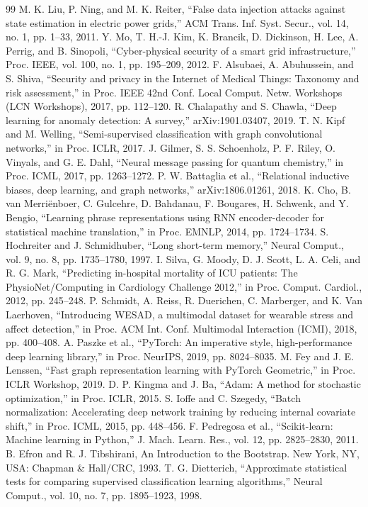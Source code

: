 \documentclass[conference]{IEEEtran}
\begin{document}
\begin{thebibliography}{99}
M. K. Liu, P. Ning, and M. K. Reiter, ``False data injection attacks against state estimation in electric power grids,'' ACM Trans. Inf. Syst. Secur., vol. 14, no. 1, pp. 1--33, 2011.
Y. Mo, T. H.-J. Kim, K. Brancik, D. Dickinson, H. Lee, A. Perrig, and B. Sinopoli, ``Cyber-physical security of a smart grid infrastructure,'' Proc. IEEE, vol. 100, no. 1, pp. 195--209, 2012.
F. Alsubaei, A. Abuhussein, and S. Shiva, ``Security and privacy in the Internet of Medical Things: Taxonomy and risk assessment,'' in Proc. IEEE 42nd Conf. Local Comput. Netw. Workshops (LCN Workshops), 2017, pp. 112--120.
R. Chalapathy and S. Chawla, ``Deep learning for anomaly detection: A survey,'' arXiv:1901.03407, 2019.
T. N. Kipf and M. Welling, ``Semi-supervised classification with graph convolutional networks,'' in Proc. ICLR, 2017.
J. Gilmer, S. S. Schoenholz, P. F. Riley, O. Vinyals, and G. E. Dahl, ``Neural message passing for quantum chemistry,'' in Proc. ICML, 2017, pp. 1263--1272.
P. W. Battaglia et al., ``Relational inductive biases, deep learning, and graph networks,'' arXiv:1806.01261, 2018.
K. Cho, B. van Merriënboer, C. Gulcehre, D. Bahdanau, F. Bougares, H. Schwenk, and Y. Bengio, ``Learning phrase representations using RNN encoder-decoder for statistical machine translation,'' in Proc. EMNLP, 2014, pp. 1724--1734.
S. Hochreiter and J. Schmidhuber, ``Long short-term memory,'' Neural Comput., vol. 9, no. 8, pp. 1735--1780, 1997.
I. Silva, G. Moody, D. J. Scott, L. A. Celi, and R. G. Mark, ``Predicting in-hospital mortality of ICU patients: The PhysioNet/Computing in Cardiology Challenge 2012,'' in Proc. Comput. Cardiol., 2012, pp. 245--248.
P. Schmidt, A. Reiss, R. Duerichen, C. Marberger, and K. Van Laerhoven, ``Introducing WESAD, a multimodal dataset for wearable stress and affect detection,'' in Proc. ACM Int. Conf. Multimodal Interaction (ICMI), 2018, pp. 400--408.
A. Paszke et al., ``PyTorch: An imperative style, high-performance deep learning library,'' in Proc. NeurIPS, 2019, pp. 8024--8035.
M. Fey and J. E. Lenssen, ``Fast graph representation learning with PyTorch Geometric,'' in Proc. ICLR Workshop, 2019.
D. P. Kingma and J. Ba, ``Adam: A method for stochastic optimization,'' in Proc. ICLR, 2015.
S. Ioffe and C. Szegedy, ``Batch normalization: Accelerating deep network training by reducing internal covariate shift,'' in Proc. ICML, 2015, pp. 448--456.
F. Pedregosa et al., ``Scikit-learn: Machine learning in Python,'' J. Mach. Learn. Res., vol. 12, pp. 2825--2830, 2011.
B. Efron and R. J. Tibshirani, An Introduction to the Bootstrap. New York, NY, USA: Chapman \& Hall/CRC, 1993.
T. G. Dietterich, ``Approximate statistical tests for comparing supervised classification learning algorithms,'' Neural Comput., vol. 10, no. 7, pp. 1895--1923, 1998.
\end{thebibliography}
\end{document}
